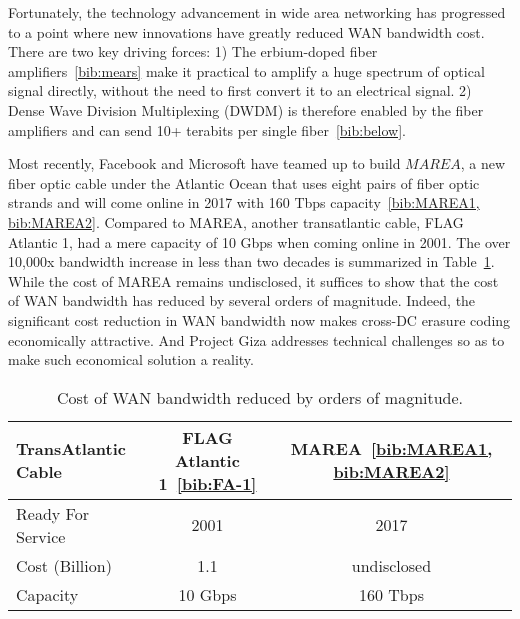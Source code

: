Fortunately, the technology advancement in wide area networking has progressed to a point where new innovations have greatly reduced WAN bandwidth cost. There are two key driving forces: 1) The erbium-doped fiber amplifiers~\ref{bib:mears} make it practical to amplify a huge spectrum of optical signal directly, without the need to first convert it to an electrical signal. 2) Dense Wave Division Multiplexing (DWDM) is therefore enabled by the fiber amplifiers and can send 10+ terabits per single fiber~\ref{bib:below}.

Most recently, Facebook and Microsoft have teamed up to build $MAREA$, a new fiber optic cable under the Atlantic Ocean that uses eight pairs of fiber optic strands and will come online in 2017 with 160 Tbps capacity~\ref{bib:MAREA1, bib:MAREA2}. Compared to MAREA, another transatlantic cable, FLAG Atlantic 1, had a mere capacity of 10 Gbps when coming online in 2001. The over 10,000x bandwidth increase in less than two decades is summarized in Table~\ref{tab:mears}. While the cost of MAREA remains undisclosed, it suffices to show that the cost of WAN bandwidth has reduced by several orders of magnitude. Indeed, the significant cost reduction in WAN bandwidth now makes cross-DC erasure coding economically attractive. And Project Giza addresses technical challenges so as to make such economical solution a reality.

\begin{table}[thp]
\centering
\begin{tabular}{|l|c|c|}
\hline
TransAtlantic Cable             & FLAG Atlantic 1~\ref{bib:FA-1}    & MAREA~\ref{bib:MAREA1, bib:MAREA2}
\\ \hline \hline
Ready For Service               & 2001                              & 2017
\\ \hline
Cost (Billion)                  & 1.1                               & undisclosed
\\ \hline
Capacity                        & 10 Gbps                           & 160 Tbps
\\ \hline \hline
\end{tabular}
\caption{Cost of WAN bandwidth reduced by orders of magnitude.}
\label{tab:mears}
\end{table}

